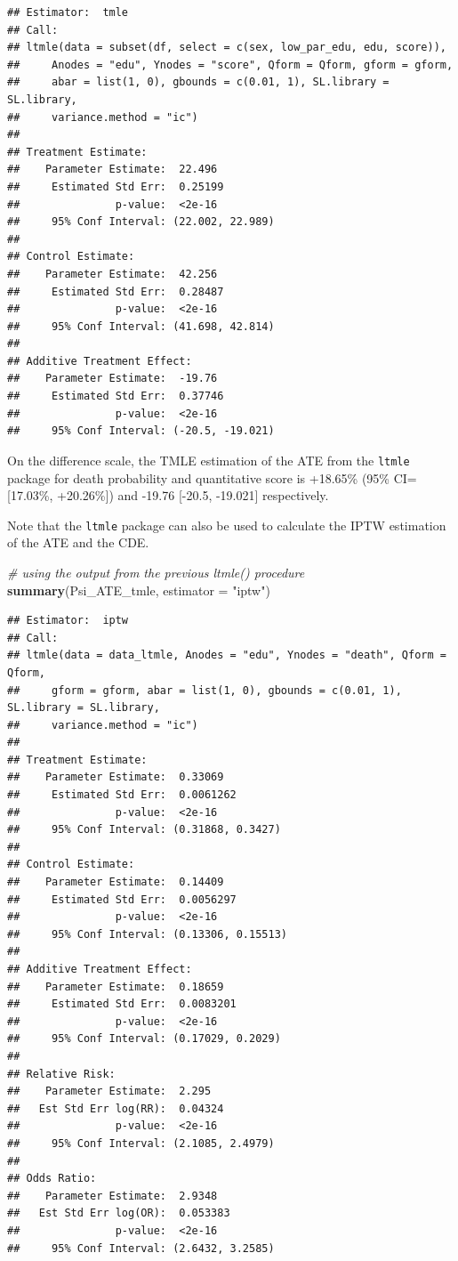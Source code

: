 \documentclass[
]{book}
\newenvironment{Shaded}{\begin{snugshade}}{\end{snugshade}}
\newcommand{\AttributeTok}[1]{\textcolor[rgb]{0.13,0.29,0.53}{#1}}
\newcommand{\CommentTok}[1]{\textcolor[rgb]{0.56,0.35,0.01}{\textit{#1}}}
\newcommand{\FunctionTok}[1]{\textcolor[rgb]{0.13,0.29,0.53}{\textbf{#1}}}
\newcommand{\NormalTok}[1]{#1}
\newcommand{\StringTok}[1]{\textcolor[rgb]{0.31,0.60,0.02}{#1}}
\begin{document}
\begin{verbatim}
## Estimator:  tmle 
## Call:
## ltmle(data = subset(df, select = c(sex, low_par_edu, edu, score)), 
##     Anodes = "edu", Ynodes = "score", Qform = Qform, gform = gform, 
##     abar = list(1, 0), gbounds = c(0.01, 1), SL.library = SL.library, 
##     variance.method = "ic")
## 
## Treatment Estimate:
##    Parameter Estimate:  22.496 
##     Estimated Std Err:  0.25199 
##               p-value:  <2e-16 
##     95% Conf Interval: (22.002, 22.989) 
## 
## Control Estimate:
##    Parameter Estimate:  42.256 
##     Estimated Std Err:  0.28487 
##               p-value:  <2e-16 
##     95% Conf Interval: (41.698, 42.814) 
## 
## Additive Treatment Effect:
##    Parameter Estimate:  -19.76 
##     Estimated Std Err:  0.37746 
##               p-value:  <2e-16 
##     95% Conf Interval: (-20.5, -19.021)
\end{verbatim}

On the difference scale, the TMLE estimation of the ATE from the \texttt{ltmle} package for death probability and quantitative score is +18.65\% (95\% CI={[}17.03\%, +20.26\%{]}) and -19.76 {[}-20.5, -19.021{]} respectively.

Note that the \texttt{ltmle} package can also be used to calculate the IPTW estimation of the ATE and the CDE.

\begin{Shaded}
\begin{Highlighting}[]
\CommentTok{\# using the output from the previous ltmle() procedure}
\FunctionTok{summary}\NormalTok{(Psi\_ATE\_tmle, }\AttributeTok{estimator =} \StringTok{"iptw"}\NormalTok{)}
\end{Highlighting}
\end{Shaded}

\begin{verbatim}
## Estimator:  iptw 
## Call:
## ltmle(data = data_ltmle, Anodes = "edu", Ynodes = "death", Qform = Qform, 
##     gform = gform, abar = list(1, 0), gbounds = c(0.01, 1), SL.library = SL.library, 
##     variance.method = "ic")
## 
## Treatment Estimate:
##    Parameter Estimate:  0.33069 
##     Estimated Std Err:  0.0061262 
##               p-value:  <2e-16 
##     95% Conf Interval: (0.31868, 0.3427) 
## 
## Control Estimate:
##    Parameter Estimate:  0.14409 
##     Estimated Std Err:  0.0056297 
##               p-value:  <2e-16 
##     95% Conf Interval: (0.13306, 0.15513) 
## 
## Additive Treatment Effect:
##    Parameter Estimate:  0.18659 
##     Estimated Std Err:  0.0083201 
##               p-value:  <2e-16 
##     95% Conf Interval: (0.17029, 0.2029) 
## 
## Relative Risk:
##    Parameter Estimate:  2.295 
##   Est Std Err log(RR):  0.04324 
##               p-value:  <2e-16 
##     95% Conf Interval: (2.1085, 2.4979) 
## 
## Odds Ratio:
##    Parameter Estimate:  2.9348 
##   Est Std Err log(OR):  0.053383 
##               p-value:  <2e-16 
##     95% Conf Interval: (2.6432, 3.2585)
\end{verbatim}
\end{document}
